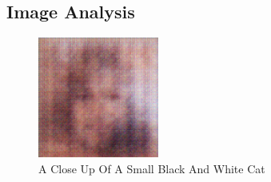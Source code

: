 \documentclass{article}%
\begin{document}
%
\subsection{Image Analysis}%
\label{subsec:ImageAnalysis}%


\begin{figure}[h!]%
\centering%
\includegraphics[width=150px]{500_fake_images/samples_5_292.png}%
\caption{A Close Up Of A Small Black And White Cat}%
\end{figure}

%
\end{document}
